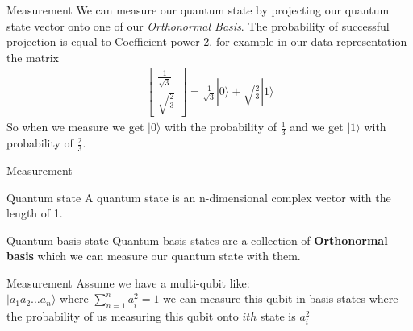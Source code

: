     \begin{frame}{Measurement}
        We can measure our quantum state by projecting our quantum state vector onto 
        one of our \emph{Orthonormal Basis}. The probability of successful projection is equal to Coefficient power 2.
        for example in our data representation the matrix\\
        \begin{align*}
        \begin{bmatrix}
            \frac{1}{\sqrt{3}}\\
            \sqrt{\frac{2}{3}}
        \end{bmatrix}
        = \frac{1}{\sqrt{3}} |0\rangle + \sqrt{\frac{2}{3}} |1\rangle
    \end{align*}
    So when we measure we get $|0\rangle$ with the probability of 
    $\frac{1}{3}$ and we get $|1\rangle$ with probability of $\frac{2}{3}$.
    \end{frame}
    \begin{frame}{Measurement}
        \begin{block}{Quantum state}
            A quantum state is an n-dimensional complex vector with the length of 1. 
        \end{block}
        \pause
        \begin{block}{Quantum basis state}
            Quantum basis states are a collection of \textbf{Orthonormal basis}
            which we can measure our quantum state with them.
        \end{block}
        \pause
        \begin{block}{Measurement}
            Assume we have a multi-qubit like:\\
            $|a_1a_2 \dots a_n \rangle$ where 
            $\sum_{n = 1}^{n} a_i^2 = 1$
            we can measure this qubit in basis states where the probability
            of us measuring this qubit onto $ith$ state is $a_i^2$
        \end{block}
    \end{frame}
